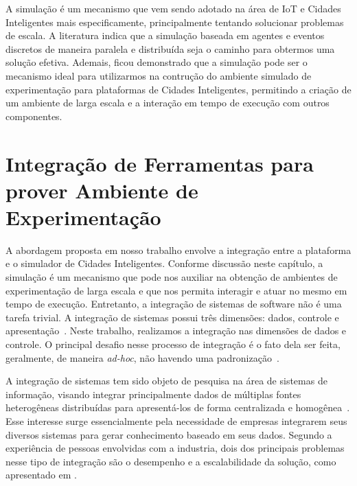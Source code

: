 A simulação é um mecanismo que vem sendo adotado na área de IoT e Cidades Inteligentes mais especificamente, principalmente tentando solucionar problemas de escala.
A literatura indica que a simulação baseada em agentes e eventos discretos de maneira paralela e distribuída seja o caminho para obtermos uma solução efetiva.
Ademais, ficou demonstrado que a simulação pode ser o mecanismo ideal para utilizarmos na contrução do ambiente simulado de experimentação para plataformas de Cidades Inteligentes, permitindo a criação
de um ambiente de larga escala e a interação em tempo de execução com outros componentes.

\section{Integração de Ferramentas para prover Ambiente de Experimentação}


A abordagem proposta em nosso trabalho envolve a integração entre a plataforma e o simulador de Cidades Inteligentes.
Conforme discussão neste capítulo, a simulação é um mecanismo que pode nos auxiliar na obtenção de ambientes de experimentação de larga escala e que nos permita interagir e atuar no mesmo em tempo de execução.
Entretanto, a integração de sistemas de software não é uma tarefa trivial.
A integração de sistemas possui três dimensões: dados, controle e apresentação~\cite{wasserman_1990}.
Neste trabalho, realizamos a integração nas dimensões de dados e controle.
O principal desafio nesse processo de integração é o fato dela ser feita, geralmente, de maneira \textit{ad-hoc}, não havendo uma padronização~\cite{wasserman_1990}.

A integração de sistemas tem sido objeto de pesquisa na área de sistemas de informação, visando integrar principalmente dados de múltiplas fontes heterogêneas distribuídas para apresentá-los de forma
centralizada e homogênea~\cite{genesereth_1997}.
Esse interesse surge essencialmente pela necessidade de empresas integrarem seus diversos sistemas para gerar conhecimento baseado em seus dados.
Segundo a experiência de pessoas envolvidas com a industria, dois dos principais problemas nesse tipo de integração são o desempenho e a escalabilidade da solução, como apresentado em \cite{halevy_2005}.

